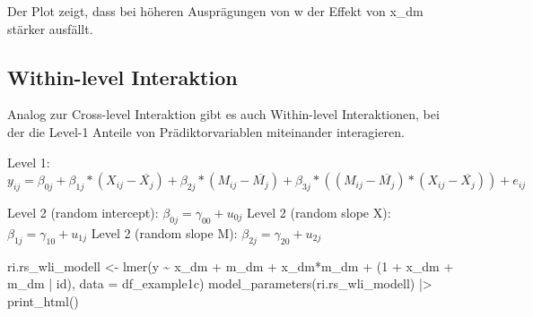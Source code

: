 \documentclass[
  letterpaper,
  DIV=11,
  numbers=noendperiod]{scrreprt}
\newenvironment{Shaded}{\begin{snugshade}}{\end{snugshade}}
\newcommand{\AttributeTok}[1]{\textcolor[rgb]{0.40,0.45,0.13}{#1}}
\newcommand{\DecValTok}[1]{\textcolor[rgb]{0.68,0.00,0.00}{#1}}
\newcommand{\FunctionTok}[1]{\textcolor[rgb]{0.28,0.35,0.67}{#1}}
\newcommand{\NormalTok}[1]{\textcolor[rgb]{0.00,0.23,0.31}{#1}}
\newcommand{\OtherTok}[1]{\textcolor[rgb]{0.00,0.23,0.31}{#1}}
\newcommand{\SpecialCharTok}[1]{\textcolor[rgb]{0.37,0.37,0.37}{#1}}
\begin{document}
Der Plot zeigt, dass bei höheren Ausprägungen von w der Effekt von x\_dm
stärker ausfällt.

\subsection{Within-level Interaktion}\label{within-level-interaktion}

Analog zur Cross-level Interaktion gibt es auch Within-level
Interaktionen, bei der die Level-1 Anteile von Prädiktorvariablen
miteinander interagieren.

Level 1:
\(y_{ij} = \beta_{0j} + \beta_{1j}*(X_{ij}-\overline{X_j}) + \beta_{2j}*(M_{ij}-\overline{M_j}) + \beta_{3j}*((M_{ij}-\overline{M_j})*(X_{ij}-\overline{X_j})) + e_{ij}\)

Level 2 (random intercept): \(\beta_{0j} = \gamma_{00} + u_{0j}\) Level
2 (random slope X): \(\beta_{1j} = \gamma_{10} + u_{1j}\) Level 2
(random slope M): \(\beta_{2j} = \gamma_{20} + u_{2j}\)

\begin{Shaded}
\begin{Highlighting}[]
\NormalTok{ri.rs\_wli\_modell }\OtherTok{\textless{}{-}} \FunctionTok{lmer}\NormalTok{(y }\SpecialCharTok{\textasciitilde{}}\NormalTok{ x\_dm }\SpecialCharTok{+}\NormalTok{ m\_dm }\SpecialCharTok{+}\NormalTok{ x\_dm}\SpecialCharTok{*}\NormalTok{m\_dm }\SpecialCharTok{+}\NormalTok{ (}\DecValTok{1} \SpecialCharTok{+}\NormalTok{ x\_dm }\SpecialCharTok{+}\NormalTok{ m\_dm }\SpecialCharTok{|}\NormalTok{ id), }\AttributeTok{data =}\NormalTok{ df\_example1c)}
\FunctionTok{model\_parameters}\NormalTok{(ri.rs\_wli\_modell) }\SpecialCharTok{|\textgreater{}} \FunctionTok{print\_html}\NormalTok{()}
\end{Highlighting}
\end{Shaded}
\end{document}
